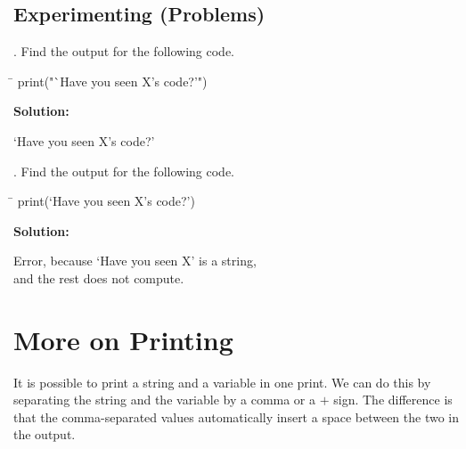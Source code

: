 \documentclass{article}
\begin{document}
\subsection{Experimenting (Problems)}
\begin{multicols}{2}
. Find the output for the following code.
\begin{tcolorbox}[width=.5\textwidth]
	\ttfamily
	\begin{tabbing}
		\hspace{3.25 in}\=\hspace{3.25 in} \kill
		print("`Have you seen X's code?'")
	\end{tabbing}
\end{tcolorbox}
\noindent\textbf{Solution:}
\begin{tcolorbox}[colback=output,width=.5\textwidth]
	\ttfamily 
	`Have you seen X's code?'\\[2 em]
\end{tcolorbox}

. Find the output for the following code.
\begin{tcolorbox}[width=.5\textwidth]
	\ttfamily
	\begin{tabbing}
		\hspace{3.25 in}\=\hspace{3.25 in} \kill
		print(`Have you seen X's code?')
	\end{tabbing}
\end{tcolorbox}
\noindent\textbf{Solution:}
\begin{tcolorbox}[colback=output,width=.5\textwidth]
	\ttfamily 
	Error, because `Have you seen X' is a string,\\
	 and the rest does not compute.
\end{tcolorbox}
\end{multicols}
\section{More on Printing}
It is possible to print a string and a variable in one print. We can do this by separating the string and the variable by a comma or a $+$ sign. The difference is that the comma-separated values automatically insert a space between the two in the output.
\end{document}
